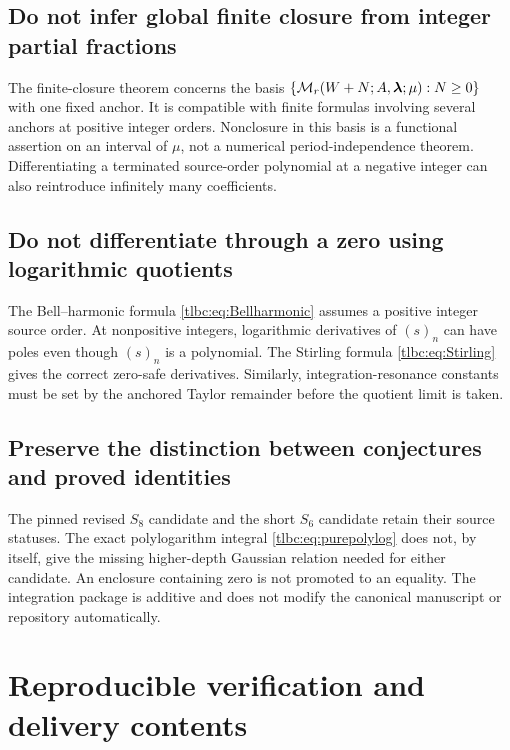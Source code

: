 \documentclass[11pt,letterpaper]{article}
\numberwithin{equation}{section}
\theoremstyle{definition}\newtheorem{definition}[theorem]{Definition}
\theoremstyle{remark}\newtheorem{remark}[theorem]{Remark}
\newcommand{\M}{\mathcal M}\newcommand{\T}{\mathcal T}\newcommand{\K}{\mathcal K}
\begin{document}
\subsection{Do not infer global finite closure from integer partial fractions}
The finite-closure theorem concerns the basis
$\{\M_r(W+N;A,\bl;\mu):N\ge0\}$ with one fixed anchor. It is compatible with finite formulas involving several anchors at positive integer orders. Nonclosure in this basis is a functional assertion on an interval of $\mu$, not a numerical period-independence theorem. Differentiating a terminated source-order polynomial at a negative integer can also reintroduce infinitely many coefficients.

\subsection{Do not differentiate through a zero using logarithmic quotients}
The Bell--harmonic formula \eqref{tlbc:eq:Bellharmonic} assumes a positive integer source order. At nonpositive integers, logarithmic derivatives of $(s)_n$ can have poles even though $(s)_n$ is a polynomial. The Stirling formula \eqref{tlbc:eq:Stirling} gives the correct zero-safe derivatives. Similarly, integration-resonance constants must be set by the anchored Taylor remainder before the quotient limit is taken.

\subsection{Preserve the distinction between conjectures and proved identities}
The pinned revised $S_8$ candidate and the short $S_6$ candidate retain their source statuses. The exact polylogarithm integral \eqref{tlbc:eq:purepolylog} does not, by itself, give the missing higher-depth Gaussian relation needed for either candidate. An enclosure containing zero is not promoted to an equality. The integration package is additive and does not modify the canonical manuscript or repository automatically.

\section{Reproducible verification and delivery contents}
\label{tlbc:sec:verification}
\end{document}
